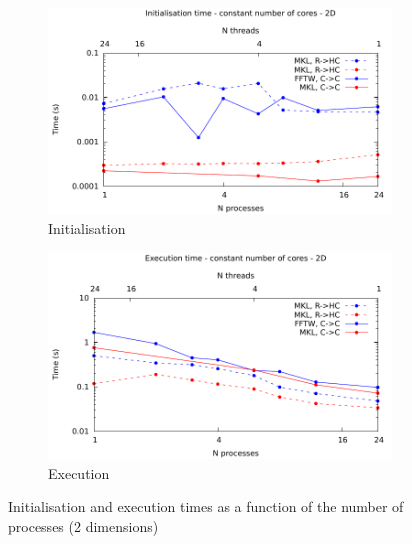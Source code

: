\documentclass[12pt, a4paper]{article} \setlength{\textheight}{24cm}
\begin{document}
\begin{figure}[H]
  \captionsetup{width=0.8\linewidth}
  \centering
  \begin{subfigure}{.5\textwidth}
    \centering
    \includegraphics[width=.9\linewidth]{graphs/const-init-2d.pdf}
    \caption{Initialisation}
    \label{2DCONSTI}
  \end{subfigure}%
  \begin{subfigure}{.5\textwidth}
    \centering
    \includegraphics[width=.9\linewidth]{graphs/const-exec-2d.pdf}
    \caption{Execution}
    \label{2DCONSTE}
  \end{subfigure}
  \caption{Initialisation and execution times as a function of the
    number of processes (2 dimensions)}
  \label{2DCONST}
\end{figure}
\end{document}
